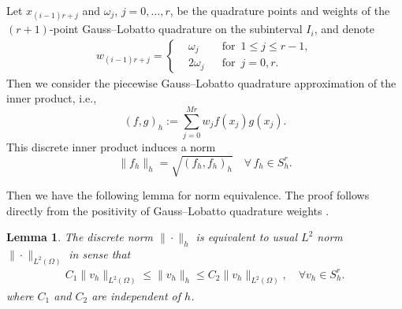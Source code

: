 \documentclass[a4paper, oneside]{book}
\def\II{(\Omega)}
\newtheorem{lemma}{Lemma}[section]
\begin{document}
Let $x_{(i-1)r+j}$ and { $\omega _{j}$}, $j=0,\dots,r$, be the quadrature
points and weights of the $(r+1)$-point Gauss--Lobatto quadrature on the subinterval $I_i$, and denote
\begin{align*}
w_{(i-1)r+j} =
\left\{
\begin{aligned}
&\omega_j &&\mbox{for}\,\,\, 1\le j\le r-1,\\
&2\omega_j &&\mbox{for}\,\,\, j=0, r.
\end{aligned}
\right.
\end{align*}
Then  we consider the piecewise Gauss--Lobatto quadrature approximation of the inner product, i.e.,
$$
(f,g)_h
:=  \sum_{j=0}^{Mr} w_j f(x_j) g(x_j)  .
$$
This discrete inner product induces a norm
$$
\|f_h\|_h=\sqrt{(f_h,f_h)_h} \quad\forall\, f_h\in S_h^r.
$$

Then we have the following lemma for norm equivalence. The proof follows directly from the positivity of
{Gauss--Lobatto} quadrature weights \cite[p. 426]{Quarteroni:2000}.


\begin{lemma}\label{lem:norm-equivalence}
The discrete norm $\| \cdot \|_h$ is equivalent to usual $L^2$ norm $\| \cdot \|_{L^2\II}$ in sense that
\begin{align*}%
 C_1 \|v_h\|_{L^2(\Omega)} \le \|v_h\|_h \le  C_2 \|v_h\|_{L^2(\Omega)} ,\quad \forall v_h\in S_h^r.
\end{align*}
where $C_1$ and $C_2$ are independent of $h$.
\end{lemma}
\end{document}
